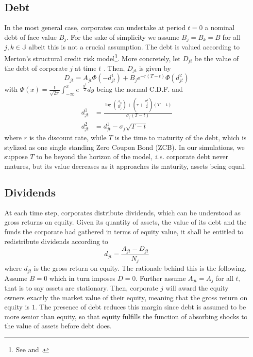 \documentclass[11pt]{article}
\begin{document}
\subsection{Debt}
In the most general case, corporates can undertake at period $t=0$ a nominal debt of face value $B_j$. For the sake of simplicity we assume $B_j=B_k=B$ for all $j,k\in \mathbb{J}$ albeit this is not a crucial assumption. The debt is valued according to Merton's structural credit risk model\footnote{See \citet{1} and \citet{2}.}. More concretely, let $D_{jt}$ be the value of the debt of corporate $j$ at time $t$ . Then, $D_{jt}$ is given by
\begin{equation}\label{4}
	D_{jt} = A_{jt} \Phi(-d_{jt}^1) + B_j e^{-r(T-t)} \Phi(d_{jt}^2)
\end{equation}
with $\Phi (x) = \frac{1}{\sqrt{2\pi}} \int_{-\infty}^x e^{-\frac{y^2}{2}} dy $ being the normal C.D.F. and
\begin{subequations}\label{5}
\begin{align}
	d^1_{jt} &= \frac{
					\log \left ( \frac{A_{jt}}{B_{j}} \right ) + \left ( r + \frac{\sigma^2_j}{2} \right ) (T-t)
					}{\sigma_j(T-t)} \label{5a}\\
	d^2_{jt} &= d^1_{jt} - \sigma_j\sqrt{T-t} \label{5b}
\end{align}
\end{subequations}
where $r$ is the discount rate, while $T$ is the time to maturity of the debt, which is stylized as one single standing Zero Coupon Bond (ZCB). In our simulations, we suppose $T$ to be beyond the horizon of the model, \emph{i.e.} corporate debt never matures, but its value decreases as it approaches its maturity, assets being equal.
\subsection{Dividends}
At each time step, corporates distribute dividends, which can be understood as gross returns on equity. Given its quantity of assets, the value of its debt and the funds the corporate had gathered in terms of equity value, it shall be entitled to redistribute dividends according to
\begin{equation}\label{6}
	d_{jt} = 
	\frac{A_{jt}-D_{jt}}{N_j}
\end{equation}
where $d_{jt}$ is the gross return on equity. The rationale behind this is the following. Assume $B=0$ which in turn imposes $D=0$. Further assume $A_{jt}=A_j$ for all $t$, that is to say assets are stationary. Then, corporate $j$ will award the equity owners exactly the market value of their equity, meaning that the gross return on equity is $1$. The presence of debt reduces this margin since debt is assumed to be more senior than equity, so that equity fulfills the function of absorbing shocks to the value of assets before debt does.
%
%
\end{document}
